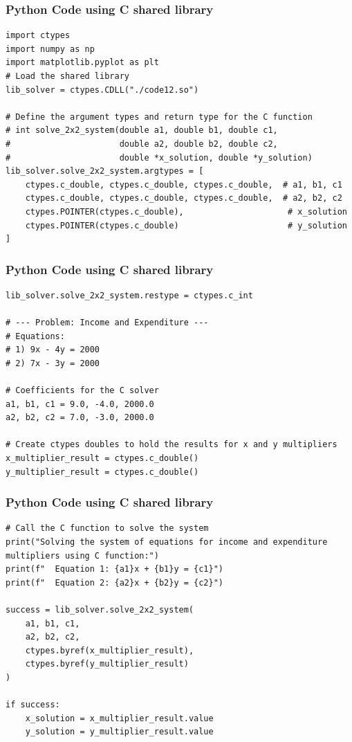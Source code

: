 \documentclass{beamer}
\begin{document}
\begin{frame}[fragile]
\frametitle{Python Code using C shared library}
\begin{lstlisting}
import ctypes
import numpy as np
import matplotlib.pyplot as plt
# Load the shared library
lib_solver = ctypes.CDLL("./code12.so")

# Define the argument types and return type for the C function
# int solve_2x2_system(double a1, double b1, double c1,
#                      double a2, double b2, double c2,
#                      double *x_solution, double *y_solution)
lib_solver.solve_2x2_system.argtypes = [
    ctypes.c_double, ctypes.c_double, ctypes.c_double,  # a1, b1, c1
    ctypes.c_double, ctypes.c_double, ctypes.c_double,  # a2, b2, c2
    ctypes.POINTER(ctypes.c_double),                     # x_solution
    ctypes.POINTER(ctypes.c_double)                      # y_solution
]
\end{lstlisting}
\end{frame}

\begin{frame}[fragile]
\frametitle{Python Code using C shared library}
\begin{lstlisting}
lib_solver.solve_2x2_system.restype = ctypes.c_int

# --- Problem: Income and Expenditure ---
# Equations:
# 1) 9x - 4y = 2000
# 2) 7x - 3y = 2000

# Coefficients for the C solver
a1, b1, c1 = 9.0, -4.0, 2000.0
a2, b2, c2 = 7.0, -3.0, 2000.0

# Create ctypes doubles to hold the results for x and y multipliers
x_multiplier_result = ctypes.c_double()
y_multiplier_result = ctypes.c_double()
\end{lstlisting}
\end{frame}

\begin{frame}[fragile]
\frametitle{Python Code using C shared library}
\begin{lstlisting}
# Call the C function to solve the system
print("Solving the system of equations for income and expenditure multipliers using C function:")
print(f"  Equation 1: {a1}x + {b1}y = {c1}")
print(f"  Equation 2: {a2}x + {b2}y = {c2}")

success = lib_solver.solve_2x2_system(
    a1, b1, c1,
    a2, b2, c2,
    ctypes.byref(x_multiplier_result),
    ctypes.byref(y_multiplier_result)
)

if success:
    x_solution = x_multiplier_result.value
    y_solution = y_multiplier_result.value
\end{lstlisting}
\end{frame}
\end{document}
